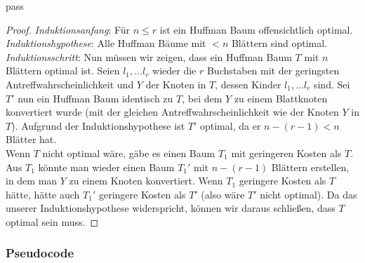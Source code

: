 pass\documentclass[a4paper,10pt,ngerman]{scrartcl}
\begin{document}
    \begin{proof}
        \textit{Induktionsanfang}:
        Für $n \le r$ ist ein Huffman Baum offensichtlich optimal. \\
        \textit{Induktionshypothese}: Alle Huffman Bäume mit $< n$ Blättern sind optimal. \\
        \textit{Induktionsschritt}: Nun müssen wir zeigen, dass ein Huffman Baum $T$ mit $n$ Blättern optimal ist.
        Seien $l_1, \dots l_r$ wieder die $r$ Buchstaben mit der geringsten Antreffwahrscheinlichkeit und $Y$ der Knoten in $T$, dessen Kinder $l_1, \dots l_r$ sind.
        Sei $T'$ nun ein Huffman Baum identisch zu $T$, bei dem $Y$ zu einem Blattknoten konvertiert wurde (mit der gleichen Antreffwahrscheinlichkeit wie der Knoten $Y$ in $T$).
        Aufgrund der Induktionshypothese ist $T'$ optimal, da er $n - (r - 1) < n$ Blätter hat.\\
        Wenn $T$ nicht optimal wäre, gäbe es einen Baum $T_1$ mit geringeren Kosten als $T$. Aus $T_1$ könnte man wieder einen Baum $T_1'$ mit $n - (r - 1)$ Blättern erstellen, in dem man $Y$ zu einem Knoten konvertiert. Wenn $T_1$ geringere Kosten als $T$ hätte, hätte auch $T_1'$ geringere Kosten als $T'$ (also wäre $T'$ nicht optimal).
        Da das unserer Induktionshypothese widerspricht, können wir daraus schließen, dass $T$ optimal sein muss.
    \end{proof}

    \subsubsection{Pseudocode}
\end{document}
